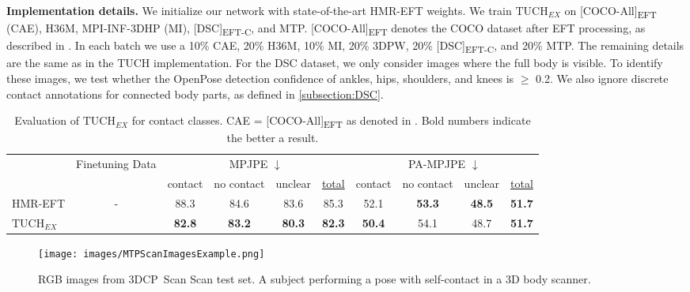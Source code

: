 \documentclass[final]{cvpr}
\newcommand{\threedcpscan}{\mbox{3DCP Scan}\xspace}
\theoremstyle{definition}
\begin{document}
\textbf{Implementation details.} We initialize our network with state-of-the-art HMR-EFT weights. We train $\text{TUCH}_{\mathit{EX}}$ on [COCO-All]\textsubscript{EFT} (CAE), H36M, MPI-INF-3DHP (MI), [DSC]\textsubscript{EFT-C}, and MTP. [COCO-All]\textsubscript{EFT} denotes the COCO dataset after EFT processing, as described in \cite{joo2020eft}. In each batch we use a 10\% CAE, 20\% H36M, 10\% MI, 20\% 3DPW, 20\% [DSC]\textsubscript{EFT-C}, and 20\% MTP. The remaining details are the same as in the TUCH implementation. For the DSC dataset, we only consider images where the full body is visible. To identify these images, we test whether the OpenPose detection confidence of ankles, hips, shoulders, and knees is $\geq$ 0.2. We also ignore discrete contact annotations for connected body parts, as defined in \ref{subsection:DSC}.

 	\begin{table*}
	\begin{center}
		\setlength\tabcolsep{1pt}
		\setlength{\extrarowheight}{2pt}
		\begin{tabular}{lc|cccc|cccc}
			\toprule[1pt]
			& \multirow{2}{*}{Finetuning Data}	& \multicolumn{4}{c}{MPJPE $\downarrow$}                     & \multicolumn{4}{c}{PA-MPJPE $\downarrow$}                  \\ \cline{3-10} 
			& & contact          & no contact       & unclear     & \underline{total}  & contact          & no contact       & unclear    & \underline{total}   \\ 
			\hline
			{\small HMR-EFT \cite{joo2020eft}}      & -     &     88.3     & 84.6          & 83.6      & 85.3    & 52.1          & \textbf{53.3}          & \textbf{48.5}    &   \textbf{51.7}   \\ 
			\hline
			{\small $\text{TUCH}_{\mathit{EX}}$ }    & \quad {\small CAE + H36M + MI + 3DPW + [DSC]\textsubscript{EFT-C} + MTP}  \quad    & \textbf{82.8} & \textbf{83.2} & \textbf{80.3} & \textbf{82.3} & \textbf{50.4} & 54.1 & 48.7& \textbf{51.7} \\ 
			\bottomrule[1pt]
		\end{tabular}
	\end{center}
	\caption{Evaluation of $\text{TUCH}_{\mathit{EX}}$ for contact classes. CAE = [COCO-All]\textsubscript{EFT} as denoted in \cite{joo2020eft}. Bold numbers indicate the better a result.}
	\label{supptab:results_3DPW_split}
\end{table*}

\begin{figure}
	\begin{center}
		\texttt{[image: images/MTPScanImagesExample.png]}
	\end{center}
	\caption{RGB images from \threedcpscan Scan test set. A subject performing a pose with self-contact in a 3D body scanner.}
	\label{fig:threedcpscanImgs}
\end{figure}
\end{document}
